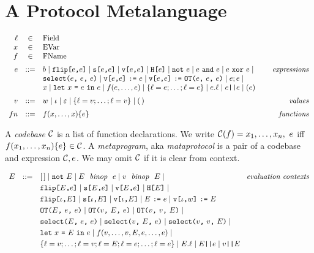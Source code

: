 \section{A Protocol Metalanguage}

$$
\begin{array}{rcl@{\hspace{8mm}}r}
\flab &\in& \mathrm{Field}\\
x &\in& \mathrm{EVar}\\
f &\in& \mathrm{FName}\\[2mm]
e &::=& b \mid \flip{e}{e} \mid \secret{e}{e} \mid \view{e}{e} \mid \oracle{e} \mid \enot\ e \mid e\ \eand\ e \mid e\ \exor\ e \mid & \textit{expressions}\\[0mm]
& & \select{e}{e}{e} \mid 
\send{\view{e}{e}}{e} \mid \send{\view{e}{e}}{\OT{e}{e}{e}} \mid e;e \mid \\[0mm]
& & x \mid \elet{x}{e}{e} \mid f(e,\ldots,e) \mid \{ \flab = e; \ldots; \flab = e \}
\mid e.\flab \mid e\ttt{||}e \mid (e) \\[2mm]
v &::=& w \mid \cid \mid \be \mid \{ \flab = v;\ldots;\flab = v \} 
\mid (\,) & \textit{values}\\[2mm]
{fn} &::=& f(x,\ldots,x) \{ e \} & \textit{functions}
\end{array}
$$

\begin{definition}
A \emph{codebase} $\mathcal{C}$ is a list of function 
declarations. We write $ \mathcal{C}(f) = x_1,\ldots,x_n,\ e$
iff $f(x_1,\ldots,x_n) \{ e \} \in \mathcal{C}$.
A \emph{metaprogram}, aka \emph{mataprotocol} is a pair of a 
codebase and expression $\mathcal{C}, e$. We may omit
$\mathcal{C}$ if it is clear from context.  
\end{definition}

$$
\begin{array}{rcl@{\hspace{3mm}}r}
E &::=& [\,] \mid \enot\ E \mid E\ \bop\ e \mid v\ \bop\ E \mid & \textit{evaluation contexts}\\[1mm]
& & \flip{E}{e} \mid \secret{E}{e} \mid \view{E}{e} \mid \oracle{E} \mid  \\[1mm]
& & \flip{\cid}{E} \mid \secret{\cid}{E} \mid \view{\cid}{E} \mid \send{E}{e} \mid \send{\view{\cid}{w}}{E}\\[1mm]
& & \OT{E}{e}{e} \mid \OT{v}{E}{e} \mid \OT{v}{v}{E} \mid\\[1mm]
& & \select{E}{e}{e} \mid \select{v}{E}{e} \mid \select{v}{v}{E} \mid\\[1mm]
& & \elet{x}{E}{e} \mid f(v,\ldots,v,E,e,\ldots,e) \mid \\[1mm]
& & \{ \flab = v;\ldots;\flab = v;\flab = E;\flab = e;\ldots;\flab = e \} \mid E.\flab \mid E\ttt{||}e \mid v \ttt{||}E
\end{array}
$$

